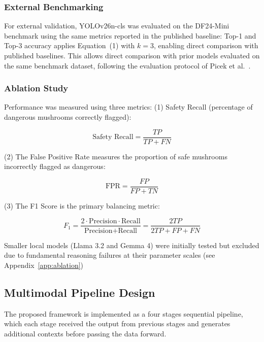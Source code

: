 \documentclass[journal,transmag]{IEEEtran}
\begin{document}
\subsubsection{\textbf{External Benchmarking}} For external validation, YOLOv26n-cls was evaluated on the DF24-Mini benchmark using the same metrics reported in the published baseline: Top-1 and  Top-3 accuracy applies 
Equation~(1) with $k=3$, enabling direct comparison with published baselines. This allows direct comparison with prior models evaluated on the same benchmark dataset, following the evaluation protocol of Picek et al.~\cite{picek2022danishfungi}.


\subsubsection{\textbf{Ablation Study}} Performance was measured using three metrics: (1) Safety Recall (percentage of dangerous mushrooms correctly flagged):

\begin{equation}
\text{Safety Recall} = \frac{TP}{TP + FN}
\end{equation}

(2) The False Positive Rate measures the proportion of 
safe mushrooms incorrectly flagged as dangerous:

\begin{equation}
\text{FPR} = \frac{FP}{FP + TN}
\end{equation}

(3) The F1 Score is the primary balancing metric:
    
\begin{equation}
F_1 = \frac{2 \cdot \text{Precision} \cdot 
\text{Recall}}{\text{Precision} + \text{Recall}} 
= \frac{2TP}{2TP + FP + FN}
\end{equation}

Smaller local models (Llama 3.2 and Gemma 4) were initially tested but excluded due to fundamental reasoning failures at their parameter scales (see Appendix~\ref{app:ablation})




\subsection{\textbf{Multimodal Pipeline Design}}
The proposed framework is implemented as a four stages sequential pipeline, which each stage received the output from previous stages and generates additional contexts before passing the data forward. 
\end{document}
